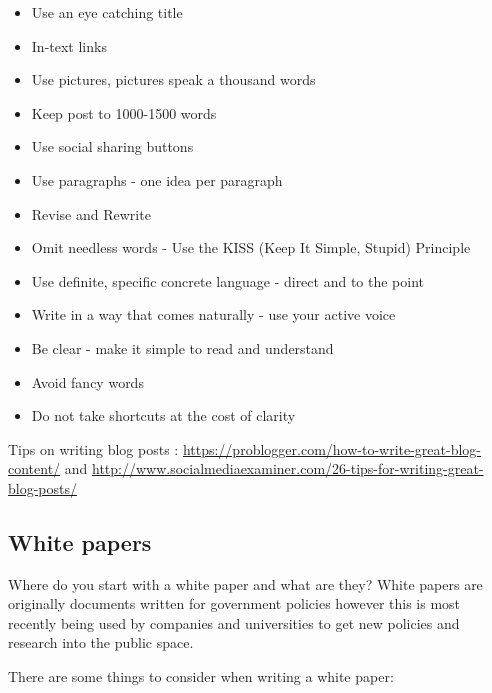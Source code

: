 \documentclass[]{book}
\providecommand{\tightlist}{%
  \setlength{\itemsep}{0pt}\setlength{\parskip}{0pt}}
\theoremstyle{definition}
\theoremstyle{definition}
\theoremstyle{remark}
\begin{document}
\begin{itemize}
\tightlist
\item
  Use an eye catching title
\item
  In-text links
\item
  Use pictures, pictures speak a thousand words
\item
  Keep post to 1000-1500 words
\item
  Use social sharing buttons
\item
  Use paragraphs - one idea per paragraph
\item
  Revise and Rewrite
\item
  Omit needless words - Use the KISS (Keep It Simple, Stupid) Principle
\item
  Use definite, specific concrete language - direct and to the point
\item
  Write in a way that comes naturally - use your active voice
\item
  Be clear - make it simple to read and understand
\item
  Avoid fancy words
\item
  Do not take shortcuts at the cost of clarity
\end{itemize}

Tips on writing blog posts :
\url{https://problogger.com/how-to-write-great-blog-content/} and
\url{http://www.socialmediaexaminer.com/26-tips-for-writing-great-blog-posts/}

\subsection{White papers}\label{white-papers}

Where do you start with a white paper and what are they? White papers
are originally documents written for government policies however this is
most recently being used by companies and universities to get new
policies and research into the public space.

There are some things to consider when writing a white paper:
\end{document}
